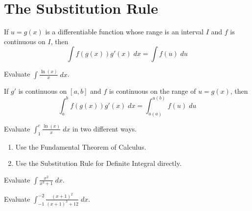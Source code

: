 \documentclass[../main.tex]{subfiles}
\begin{document}
\clearpage

\section{The Substitution Rule}

\begin{mdframed}[style=withref]
  If \(u = g(x)\) is a differentiable function whose range is an interval \(I\) and \(f\) is continuous on \(I\), then
  \[
    {\int f(g(x)) g'(x) \;dx = \int f(u) \;du}
  \]
\end{mdframed}
\vspace{2in}

\begin{example}
  Evaluate \(\int \frac{\ln(x)}{x} \;dx\).

\end{example}

\clearpage
\begin{mdframed}[style=withref]
  If \(g'\) is continuous on \([a,b]\) and \(f\) is continuous on the range of \(u = g(x)\), then
  \[
    {\int_{a}^{b} f(g(x)) g'(x) \;dx = \int_{u(a)}^{u(b)} f(u) \;du}
  \]
\end{mdframed}
\vspace{1in}

\begin{example}
  Evaluate \(\int_{1}^{e} \frac{\ln(x)}{x} \;dx\) in two different ways.

  \begin{enumerate}
  \item Use the Fundamental Theorem of Calculus.
    \vspace{2in}

  \item Use the Substitution Rule for Definite Integral directly.

  \end{enumerate}
\end{example}

\clearpage
\begin{example}
  Evaluate \(\int \frac{x^{2}}{x^{3} + 1} \;dx\).
\end{example}
\clearpage

\begin{example}
  Evaluate \(\int_{-1}^{-2} \frac{(x+1)^{2}}{(x+1)^{3} + 12} \;dx\).
\end{example}
\clearpage
\end{document}
